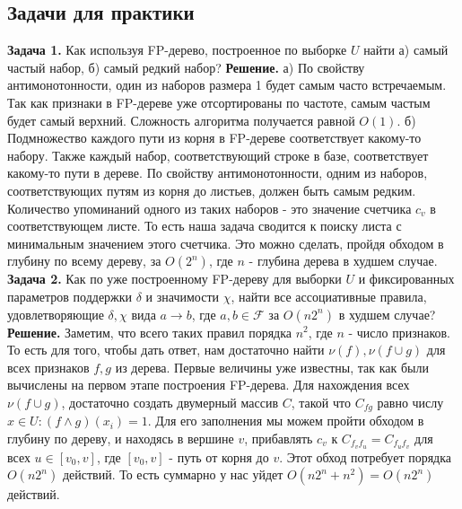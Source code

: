 \subsection{Задачи для практики}
\textbf{Задача 1.} Как используя FP-дерево, построенное по выборке $U$ найти а) самый частый набор, б) самый редкий набор?
\newline\newline
\textbf{Решение.} 
\newline
а) По свойству антимонотонности, один из наборов размера 1 будет самым часто встречаемым. Так как признаки в FP-дереве уже отсортированы по частоте, самым частым будет самый верхний. Сложность алгоритма получается равной $O(1)$.
\newline
б) Подмножество каждого пути из корня в FP-дереве соответствует какому-то набору. Также каждый набор, соответствующий строке в базе, соответствует какому-то пути в дереве. По свойству антимонотонности, одним из наборов, соответствующих путям из корня до листьев, должен быть самым редким. Количество упоминаний одного из таких наборов - это значение счетчика $c_v$ в соответствующем листе. То есть наша задача сводится к поиску листа с минимальным значением этого счетчика. Это можно сделать, пройдя обходом в глубину по всему дереву, за $O(2^n)$, где $n$ - глубина дерева в худшем случае.
\newline\newline
\textbf{Задача 2.} Как по уже построенному FP-дереву для выборки $U$ и фиксированных параметров поддержки $\delta$ и значимости $\chi$, найти все ассоциативные правила, удовлетворяющие $\delta, \chi$ вида $a \to b$, где $a,b \in \mathcal{F}$ за $O(n2^n)$ в худшем случае?
\newline\newline
\textbf{Решение.} 
\newline
Заметим, что всего таких правил порядка $n^2$, где $n$ - число признаков. То есть для того, чтобы дать ответ, нам достаточно найти $\nu(f), \nu(f \cup g)$ для всех признаков $f,g$ из дерева. Первые величины уже известны, так как были вычислены на первом этапе построения FP-дерева. Для нахождения всех $\nu(f \cup g)$, достаточно создать двумерный массив $C$, такой что $C_{fg}$ равно числу $x \in U: (f \wedge g)(x_i) = 1$. Для его заполнения мы можем пройти обходом в глубину по дереву, и находясь в вершине $v$, прибавлять $c_v$ к $C_{f_vf_u} = C_{f_uf_v}$ для всех $u \in [v_0, v]$, где $ [v_0, v]$ - путь от корня до $v$. Этот обход потребует порядка $O(n2^n)$ действий. То есть суммарно у нас уйдет $O(n2^n + n^2) = O(n2^n)$ действий.
